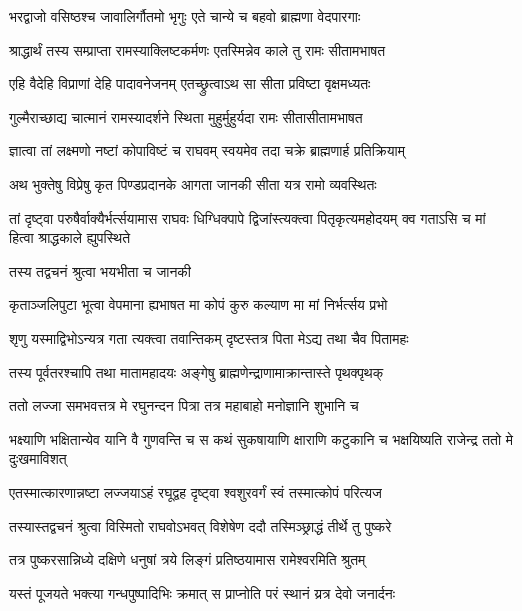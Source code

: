 \twolineshloka
{भरद्वाजो वसिष्ठश्च जावालिर्गौतमो भृगुः}
{एते चान्ये च बहवो ब्राह्मणा वेदपारगाः}%

\twolineshloka
{श्राद्धार्थं तस्य सम्प्राप्ता रामस्याक्लिष्टकर्मणः}
{एतस्मिन्नेव काले तु रामः सीतामभाषत}%

\twolineshloka
{एहि वैदेहि विप्राणां देहि पादावनेजनम्}
{एतच्छ्रुत्वाऽथ सा सीता प्रविष्टा वृक्षमध्यतः}%

\twolineshloka
{गुल्मैराच्छाद्य चात्मानं रामस्यादर्शने स्थिता}
{मुहुर्मुहुर्यदा रामः सीतासीतामभाषत}%

\twolineshloka
{ज्ञात्वा तां लक्ष्मणो नष्टां कोपाविष्टं च राघवम्}
{स्वयमेव तदा चक्रे ब्राह्मणार्ह प्रतिक्रियाम्}%

\twolineshloka
{अथ भुक्तेषु विप्रेषु कृत पिण्डप्रदानके}
{आगता जानकी सीता यत्र रामो व्यवस्थितः}%

\threelineshloka
{तां दृष्ट्वा परुषैर्वाक्यैर्भर्त्सयामास राघवः}
{धिग्धिक्पापे द्विजांस्त्यक्त्वा पितृकृत्यमहोदयम्}
{क्व गताऽसि च मां हित्वा श्राद्धकाले ह्युपस्थिते}%


\onelineshloka
{तस्य तद्वचनं श्रुत्वा भयभीता च जानकी}%

\twolineshloka
{कृताञ्जलिपुटा भूत्वा वेपमाना ह्यभाषत}
{मा कोपं कुरु कल्याण मा मां निर्भर्त्सय प्रभो}%

\twolineshloka
{शृणु यस्माद्विभोऽन्यत्र गता त्यक्त्वा तवान्तिकम्}
{दृष्टस्तत्र पिता मेऽद्य तथा चैव पितामहः}%

\twolineshloka
{तस्य पूर्वतरश्चापि तथा मातामहादयः}
{अङ्गेषु ब्राह्मणेन्द्राणामाक्रान्तास्ते पृथक्पृथक्}%

\twolineshloka
{ततो लज्जा समभवत्तत्र मे रघुनन्दन}
{पित्रा तत्र महाबाहो मनोज्ञानि शुभानि च}%

\threelineshloka
{भक्ष्याणि भक्षितान्येव यानि वै गुणवन्ति च}
{स कथं सुकषायाणि क्षाराणि कटुकानि च}
{भक्षयिष्यति राजेन्द्र ततो मे दुःखमाविशत्}%

\twolineshloka
{एतस्मात्कारणान्नष्टा लज्जयाऽहं रघूद्वह}
{दृष्ट्वा श्वशुरवर्गं स्वं तस्मात्कोपं परित्यज}%

\twolineshloka
{तस्यास्तद्वचनं श्रुत्वा विस्मितो राघवोऽभवत्}
{विशेषेण ददौ तस्मिञ्छ्राद्धं तीर्थे तु पुष्करे}%

\twolineshloka
{तत्र पुष्करसान्निध्ये दक्षिणे धनुषां त्रये}
{लिङ्गं प्रतिष्ठयामास रामेश्वरमिति श्रुतम्}%

\twolineshloka
{यस्तं पूजयते भक्त्या गन्धपुष्पादिभिः क्रमात्}
{स प्राप्नोति परं स्थानं य्रत्र देवो जनार्दनः}%

